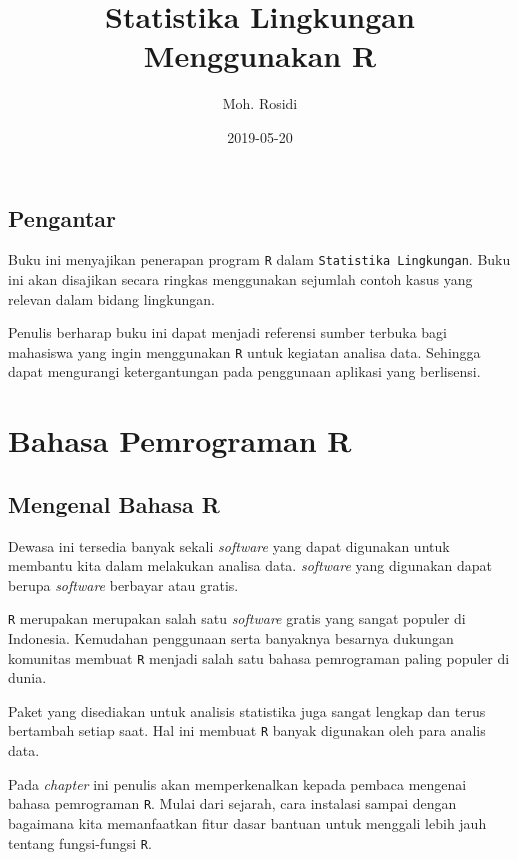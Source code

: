 \documentclass[]{book}
\title{Statistika Lingkungan Menggunakan R}
\author{Moh. Rosidi}
\date{2019-05-20}
\begin{document}
\maketitle

{
\hypersetup{linkcolor=black}
\setcounter{tocdepth}{1}
\tableofcontents
}
\listoftables
\listoffigures
\chapter*{Pengantar}\label{pengantar}

Buku ini menyajikan penerapan program \texttt{R} dalam
\texttt{Statistika\ Lingkungan}. Buku ini akan disajikan secara ringkas
menggunakan sejumlah contoh kasus yang relevan dalam bidang lingkungan.

Penulis berharap buku ini dapat menjadi referensi sumber terbuka bagi
mahasiswa yang ingin menggunakan \texttt{R} untuk kegiatan analisa data.
Sehingga dapat mengurangi ketergantungan pada penggunaan aplikasi yang
berlisensi.

\part*{Bahasa Pemrograman R}\label{part-bahasa-pemrograman-r}

\chapter{Mengenal Bahasa R}\label{mengenal-bahasa-r}

Dewasa ini tersedia banyak sekali \emph{software} yang dapat digunakan
untuk membantu kita dalam melakukan analisa data. \emph{software} yang
digunakan dapat berupa \emph{software} berbayar atau gratis.

\texttt{R} merupakan merupakan salah satu \emph{software} gratis yang
sangat populer di Indonesia. Kemudahan penggunaan serta banyaknya
besarnya dukungan komunitas membuat \texttt{R} menjadi salah satu bahasa
pemrograman paling populer di dunia.

Paket yang disediakan untuk analisis statistika juga sangat lengkap dan
terus bertambah setiap saat. Hal ini membuat \texttt{R} banyak digunakan
oleh para analis data.

Pada \emph{chapter} ini penulis akan memperkenalkan kepada pembaca
mengenai bahasa pemrograman \texttt{R}. Mulai dari sejarah, cara
instalasi sampai dengan bagaimana kita memanfaatkan fitur dasar bantuan
untuk menggali lebih jauh tentang fungsi-fungsi \texttt{R}.
\end{document}
